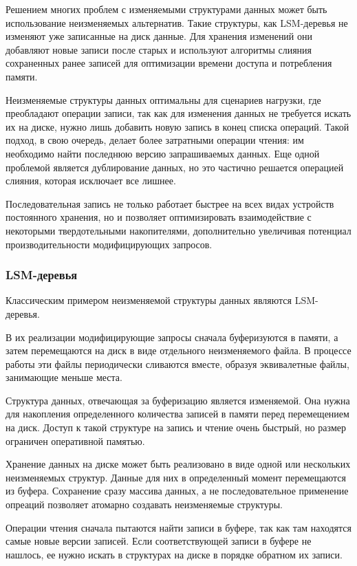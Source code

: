 \documentclass[14pt, russian]{scrartcl}
\begin{document}
Решением многих проблем с изменяемыми структурами данных может быть
использование неизменяемых альтернатив. Такие структуры, как LSM-деревья не
изменяют уже записанные на диск данные. Для хранения изменений они добавляют
новые записи после старых и используют алгоритмы слияния сохраненных ранее
записей для оптимизации времени доступа и потребления памяти.

Неизменяемые структуры данных оптимальны для сценариев нагрузки, где преобладают
операции записи, так как для изменения данных не требуется искать их на диске,
нужно лишь добавить новую запись в конец списка операций. Такой подход, в свою
очередь, делает более затратными операции чтения: им необходимо найти последнюю
версию запрашиваемых данных. Еще одной проблемой является дублирование данных,
но это частично решается операцией слияния, которая исключает все лишнее.

Последовательная запись не только работает быстрее на всех видах устройств
постоянного хранения, но и позволяет оптимизировать взаимодействие с некоторыми
твердотельными накопителями, дополнительно увеличивая потенциал
производительности модифицирующих запросов.

\subsubsection{LSM-деревья}

Классическим примером неизменяемой структуры данных являются LSM-деревья.

В их реализации модифицирующие запросы сначала буферизуются в памяти, а затем
перемещаются на диск в виде отдельного неизменяемого файла. В процессе работы
эти файлы периодически сливаются вместе, образуя эквивалетные файлы, занимающие
меньше места.

Структура данных, отвечающая за буферизацию является изменяемой. Она нужна для
накопления определенного количества записей в памяти перед перемещением на диск.
Доступ к такой структуре на запись и чтение очень быстрый, но размер ограничен
оперативной памятью.

Хранение данных на диске может быть реализовано в виде одной или нескольких
неизменяемых структур. Данные для них в определенный момент перемещаются из
буфера. Сохранение сразу массива данных, а не последовательное применение
опреаций позволяет атомарно создавать неизменяемые структуры.

Операции чтения сначала пытаются найти записи в буфере, так как там находятся
самые новые версии записей. Если соответствующей записи в буфере не нашлось, ее
нужно искать в структурах на диске в порядке обратном их записи.
\end{document}
